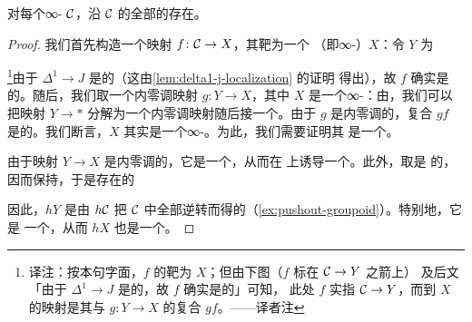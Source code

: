 \begin{lemma}\label{lem:localization-all-morphisms}
对每个∞-\trCategory{} $\mathcal{C}$，沿 $\mathcal{C}$ 的全部\trMorphism{}的\trLocalization{}存在。
\end{lemma}

\begin{proof}
我们首先构造一个\trAnodyne{}映射 $f\colon \mathcal{C} \to X$，其靶为一个\trKanComplex{}%
（即∞-\trGroupoid{}）$X$：令 $Y$ 为\trPushout{}%
\begin{center}
\end{center}
\footnote{译注：按本句字面，$f$ 的靶为 $X$；但由下图（$f$ 标在 $\mathcal{C} \to Y$ 之箭上）
及后文「由于 $\Delta^1 \to J$ 是\trAnodyne{}的，故 $f$ 确实是\trAnodyne{}的」可知，
此处 $f$ 实指 $\mathcal{C} \to Y$，而到 $X$ 的\trAnodyne{}映射是其与 $g\colon Y \to X$ 的复合
$gf$。——译者注}由于 $\Delta^1 \to J$ 是\trAnodyne{}的（这由\cref{lem:delta1-j-localization} 的证明
得出），故 $f$ 确实是\trAnodyne{}的。随后，我们取一个内零调映射 $g\colon Y \to X$，其中 $X$
是一个∞-\trCategory{}：由\trSmallObjectArgument{}，我们可以把映射 $Y \to \ast$
分解为一个内零调映射随后接一个\trInnerFibration{}。由于 $g$ 是内零调的，复合 $gf$
是\trAnodyne{}的。我们断言，$X$ 其实是一个∞-\trGroupoid{}。为此，我们需要证明其%
\trHomotopyCategory{}是一个\trGroupoid{}。

由于映射 $Y \to X$ 是内零调的，它是一个\trJoyalEquivalence{}，从而在%
\trHomotopyCategory{}上诱导一个\trEquivalence{}。此外，取\trHomotopyCategory{}是%
\trNerve{}\trFunctor{}的\trLeftAdjoint{}，因而保持\trPushout{}，于是存在\trCategories{}的%
\trPushout{}%
\begin{center}
\end{center}
因此，$hY$ 是由 $h\mathcal{C}$ 把 $\mathcal{C}$ 中全部\trMorphism{}逆转而得的（\cref{ex:pushout-groupoid}）。特别地，它是
一个\trGroupoid{}，从而 $hX$ 也是一个\trGroupoid{}。


\end{proof}
